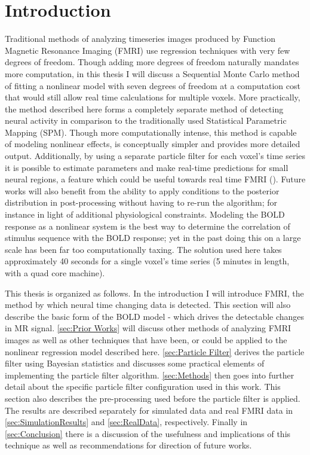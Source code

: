 \chapter{Introduction}
Traditional methods of analyzing timeseries images produced by 
Function Magnetic Resonance 
Imaging (FMRI) use regression techniques with very few degrees of freedom. 
Though adding more degrees of freedom naturally mandates more computation,
in this thesis I will discuss a Sequential Monte Carlo method of fitting a nonlinear
model with seven degrees of freedom at 
a computation cost that would still allow real time calculations for multiple voxels.
More practically, the method described here forms a completely
separate method of detecting neural activity in comparison to the traditionally
used Statistical Parametric Mapping (SPM). Though more computationally intense,
this method is capable of modeling nonlinear effects, is conceptually simpler
and provides more detailed output. Additionally,
by using a separate particle filter for each voxel's time
series it is possible to estimate parameters and make real-time predictions
for small neural regions, a feature which could be useful towards real time FMRI 
(\cite{DeCharms2005}). Future works will also benefit from the ability to 
apply conditions to the posterior distribution in post-processing without
having to re-run the algorithm; for instance in light of additional physiological
constraints. Modeling the BOLD response as a nonlinear system is the
best way to determine the correlation of stimulus sequence with the BOLD
response; yet in the past doing this on a large scale has been far too
computationally taxing. The solution used here takes approximately 40 seconds
for a single voxel's time series (5 minutes in length, with a quad core machine). 

This thesis is organized as follows. In the introduction I will introduce
FMRI, the method by which neural time changing data is detected. This section
will also describe the basic form of the BOLD model - which drives the 
detectable changes in MR signal. \autoref{sec:Prior Works} will discuss other
methods of analyzing FMRI images as well as other techniques that have
been, or could be applied to the nonlinear regression model described here. 
\autoref{sec:Particle Filter} derives the particle filter using Bayesian 
statistics and discusses some practical elements of implementing the 
particle filter algorithm. \autoref{sec:Methods} then goes into further
detail about the specific particle filter configuration used in this work.
This section also describes the pre-processing used before the particle
filter is applied. The results are described separately for simulated data
and real FMRI data in \autoref{sec:SimulationResults} and \autoref{sec:RealData},
respectively. Finally in \autoref{sec:Conclusion} there is a discussion of
the usefulness and implications of this technique as well as recommendations
for direction of future works. 


